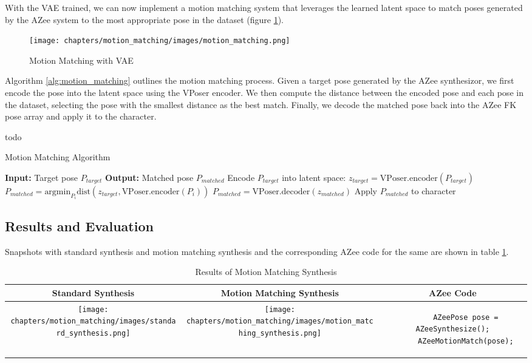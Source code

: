 \documentclass[../../main.tex]{subfiles}
\begin{document}
With the VAE trained, we can now implement a motion matching system that leverages the learned latent space to match poses generated by the AZee system to the most appropriate pose in the dataset (figure \ref{fig:motion_matching}).

\begin{figure}
  \centering \texttt{[image: chapters/motion\_matching/images/motion\_matching.png]}
  \caption{Motion Matching with VAE}
  \label{fig:motion_matching}
\end{figure}

Algorithm \ref{alg:motion_matching} outlines the motion matching process. Given a target pose generated by the AZee synthesizor, we first encode the pose into the latent space using the VPoser encoder. We then compute the distance between the encoded pose and each pose in the dataset, selecting the pose with the smallest distance as the best match. Finally, we decode the matched pose back into the AZee FK pose array and apply it to the character.

todo
\begin{algorithm}
  \caption{Motion Matching Algorithm}
  \label{alg:motion_matching}
  \begin{algorithmic}
    \STATE \textbf{Input:} Target pose $P_{target}$
    \STATE \textbf{Output:} Matched pose $P_{matched}$
    \STATE Encode $P_{target}$ into latent space: $z_{target} = \text{VPoser.encoder}(P_{target})$
    \STATE $P_{matched} = \text{argmin}_{P_i} \text{dist}(z_{target}, \text{VPoser.encoder}(P_i))$
    \STATE $P_{matched} = \text{VPoser.decoder}(z_{matched})$
    \STATE Apply $P_{matched}$ to character
  \end{algorithmic}
\end{algorithm}

\subsection{Results and Evaluation}
\label{ch:motion_matching:motion_matching_with_azee:results}

Snapshots with standard synthesis and motion matching synthesis and the corresponding AZee code for the same are shown in table \ref{tab:results}.

\begin{table}
  \centering
  \begin{tabular}{|c|c|c|}
    \hline
    \textbf{Standard Synthesis} & \textbf{Motion Matching Synthesis} & \textbf{AZee Code} \\
    \hline
    \texttt{[image: chapters/motion\_matching/images/standard\_synthesis.png]} & \texttt{[image: chapters/motion\_matching/images/motion\_matching\_synthesis.png]} & \begin{lstlisting}
      AZeePose pose = AZeeSynthesize();
      AZeeMotionMatch(pose);
    \end{lstlisting} \\
    \hline
  \end{tabular}
  \caption{Results of Motion Matching Synthesis}
  \label{tab:results}
\end{table}
\end{document}
